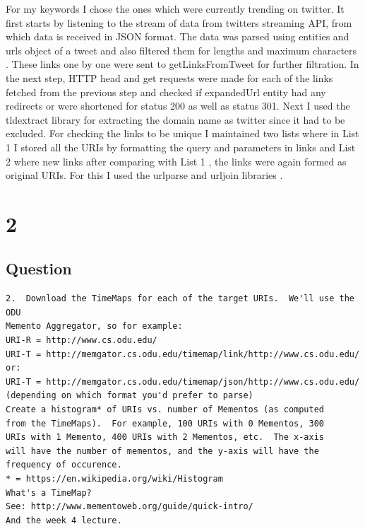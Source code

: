 \documentclass[letterpaper,11pt]{article}
\begin{document}

For my keywords I chose the ones which were currently trending on twitter. It first starts by listening to the stream of data from twitters streaming API, from which data is received in JSON format. The data was parsed using entities and urls object of a tweet and also filtered them for lengths and maximum characters \cite{streamref}. These links one by one were sent to getLinksFromTweet for further filtration.
In the next step, HTTP head and get requests \cite{urllibref} were made for each of the links fetched from the previous step and checked if expandedUrl entity had any redirects or were shortened for status 200 as well as status 301. Next I used the tldextract \cite{tlderef} library for extracting the domain name as twitter since it had to be excluded. For checking the links to  be unique I maintained two lists where in List 1 I stored all the URIs by formatting the query and parameters in links and List 2 where new links after comparing with List 1 , the links were again formed as original URIs. For this I used the urlparse and urljoin libraries \cite{parseref}.
\clearpage
\section*{2}
\subsection*{Question}
\begin{verbatim}
2.  Download the TimeMaps for each of the target URIs.  We'll use the ODU 
Memento Aggregator, so for example:
URI-R = http://www.cs.odu.edu/
URI-T = http://memgator.cs.odu.edu/timemap/link/http://www.cs.odu.edu/
or:
URI-T = http://memgator.cs.odu.edu/timemap/json/http://www.cs.odu.edu/
(depending on which format you'd prefer to parse)
Create a histogram* of URIs vs. number of Mementos (as computed
from the TimeMaps).  For example, 100 URIs with 0 Mementos, 300
URIs with 1 Memento, 400 URIs with 2 Mementos, etc.  The x-axis
will have the number of mementos, and the y-axis will have the
frequency of occurence.
* = https://en.wikipedia.org/wiki/Histogram
What's a TimeMap?  
See: http://www.mementoweb.org/guide/quick-intro/
And the week 4 lecture. 
\end{verbatim}
\clearpage
\end{document}
